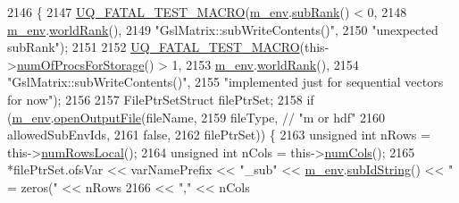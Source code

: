 \begin{DoxyCode}
2146 \{
2147   \hyperlink{_defines_8h_a56d63d18d0a6d45757de47fcc06f574d}{UQ\_FATAL\_TEST\_MACRO}(\hyperlink{class_q_u_e_s_o_1_1_matrix_a247fb0fc0b87fecdee054bb4660b68e8}{m\_env}.\hyperlink{class_q_u_e_s_o_1_1_base_environment_a172d52f993f1322ed45aaddf71518dbb}{subRank}() < 0,
2148                       \hyperlink{class_q_u_e_s_o_1_1_matrix_a247fb0fc0b87fecdee054bb4660b68e8}{m\_env}.\hyperlink{class_q_u_e_s_o_1_1_base_environment_a78b57112bbd0e6dd0e8afec00b40ffa7}{worldRank}(),
2149                       \textcolor{stringliteral}{"GslMatrix::subWriteContents()"},
2150                       \textcolor{stringliteral}{"unexpected subRank"});
2151 
2152   \hyperlink{_defines_8h_a56d63d18d0a6d45757de47fcc06f574d}{UQ\_FATAL\_TEST\_MACRO}(this->\hyperlink{class_q_u_e_s_o_1_1_matrix_a7d7310149ecf33ca68c5ef7a815093db}{numOfProcsForStorage}() > 1,
2153                       \hyperlink{class_q_u_e_s_o_1_1_matrix_a247fb0fc0b87fecdee054bb4660b68e8}{m\_env}.\hyperlink{class_q_u_e_s_o_1_1_base_environment_a78b57112bbd0e6dd0e8afec00b40ffa7}{worldRank}(),
2154                       \textcolor{stringliteral}{"GslMatrix::subWriteContents()"},
2155                       \textcolor{stringliteral}{"implemented just for sequential vectors for now"});
2156 
2157   FilePtrSetStruct filePtrSet;
2158   \textcolor{keywordflow}{if} (\hyperlink{class_q_u_e_s_o_1_1_matrix_a247fb0fc0b87fecdee054bb4660b68e8}{m\_env}.\hyperlink{class_q_u_e_s_o_1_1_base_environment_ab8fe853074f12ea34e18724119a2fc75}{openOutputFile}(fileName,
2159                            fileType, \textcolor{comment}{// "m or hdf"}
2160                            allowedSubEnvIds,
2161                            \textcolor{keyword}{false},
2162                            filePtrSet)) \{
2163     \textcolor{keywordtype}{unsigned} \textcolor{keywordtype}{int} nRows = this->\hyperlink{class_q_u_e_s_o_1_1_gsl_matrix_ab5ec937a9fd439eef1a87e12c0dbccb4}{numRowsLocal}();
2164     \textcolor{keywordtype}{unsigned} \textcolor{keywordtype}{int} nCols = this->\hyperlink{class_q_u_e_s_o_1_1_gsl_matrix_ad5005f168fe030468e834776afb1859b}{numCols}();
2165     *filePtrSet.ofsVar << varNamePrefix << \textcolor{stringliteral}{"\_sub"} << \hyperlink{class_q_u_e_s_o_1_1_matrix_a247fb0fc0b87fecdee054bb4660b68e8}{m\_env}.\hyperlink{class_q_u_e_s_o_1_1_base_environment_a73f7849acdd5d5ba15a3094fe18f258f}{subIdString}() << \textcolor{stringliteral}{" = zeros("} << 
      nRows
2166                        << \textcolor{stringliteral}{","}                                                           << nCols

\end{DoxyCode}
